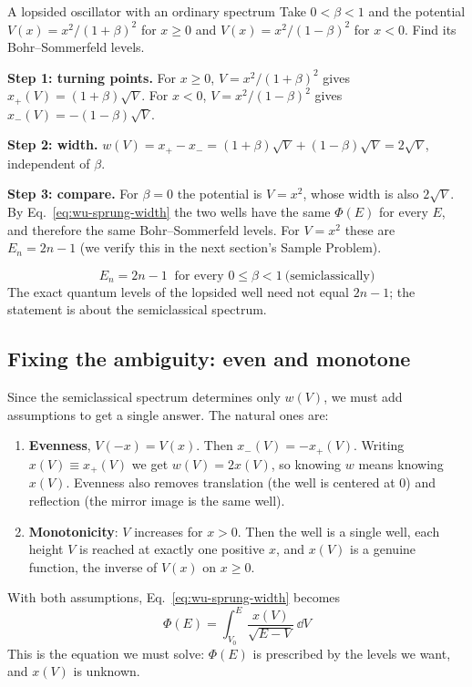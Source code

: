 \begin{sample}{A lopsided oscillator with an ordinary spectrum}
Take $0<\beta<1$ and the potential $V(x)=x^2/(1+\beta)^2$ for $x\ge0$ and $V(x)=x^2/(1-\beta)^2$ for $x<0$. Find its Bohr--Sommerfeld levels.

\textbf{Step 1: turning points.} For $x\ge0$, $V=x^2/(1+\beta)^2$ gives $x_+(V)=(1+\beta)\sqrt V$. For $x<0$, $V=x^2/(1-\beta)^2$ gives $x_-(V)=-(1-\beta)\sqrt V$.

\textbf{Step 2: width.} $w(V)=x_+-x_-=(1+\beta)\sqrt V+(1-\beta)\sqrt V=2\sqrt V$, independent of $\beta$.

\textbf{Step 3: compare.} For $\beta=0$ the potential is $V=x^2$, whose width is also $2\sqrt V$. By Eq.~\eqref{eq:wu-sprung-width} the two wells have the same $\Phi(E)$ for every $E$, and therefore the same Bohr--Sommerfeld levels. For $V=x^2$ these are $E_n=2n-1$ (we verify this in the next section's Sample Problem).

\[
\boxed{E_n=2n-1\ \text{ for every }0\le\beta<1\ \text{(semiclassically)}}
\]
The exact quantum levels of the lopsided well need not equal $2n-1$; the statement is about the semiclassical spectrum.
\end{sample}

\subsection{Fixing the ambiguity: even and monotone}

Since the semiclassical spectrum determines only $w(V)$, we must add assumptions to get a single answer. The natural ones are:
\begin{enumerate}
\item \textbf{Evenness}, $V(-x)=V(x)$. Then $x_-(V)=-x_+(V)$. Writing $x(V)\equiv x_+(V)$ we get $w(V)=2x(V)$, so knowing $w$ means knowing $x(V)$. Evenness also removes translation (the well is centered at $0$) and reflection (the mirror image is the same well).
\item \textbf{Monotonicity}: $V$ increases for $x>0$. Then the well is a single well, each height $V$ is reached at exactly one positive $x$, and $x(V)$ is a genuine function, the inverse of $V(x)$ on $x\ge0$.
\end{enumerate}
With both assumptions, Eq.~\eqref{eq:wu-sprung-width} becomes
\begin{equation}
\boxed{\;\Phi(E)=\int_{V_0}^{E}\frac{x(V)}{\sqrt{E-V}}\,\dd V\;}
\label{eq:wu-sprung-layer}
\end{equation}
This is the equation we must solve: $\Phi(E)$ is prescribed by the levels we want, and $x(V)$ is unknown.

